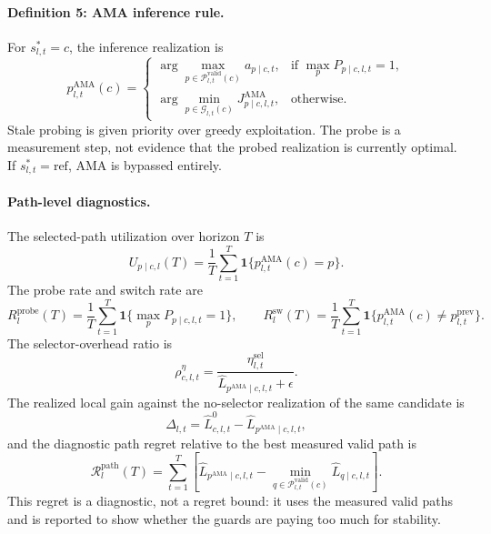 \documentclass{article}
\newcommand{\ama}{\textsc{AMA}}
\begin{document}
\paragraph{Definition 5: AMA inference rule.}
For $s^*_{l,t}=c$, the inference realization is
\begin{equation}
p^{\mathrm{AMA}}_{l,t}(c)
=
\begin{cases}
\arg\max_{p\in\mathcal{P}^{\mathrm{valid}}_{l,t}(c)} a_{p\mid c,t},
& \text{if } \max_p P_{p\mid c,l,t}=1,\\
\arg\min_{p\in\mathcal{G}_{l,t}(c)}J^{\mathrm{AMA}}_{p\mid c,l,t},
& \text{otherwise.}
\end{cases}
\label{eq:ama-selection}
\end{equation}
Stale probing is given priority over greedy exploitation. The probe is a
measurement step, not evidence that the probed realization is currently optimal.
If $s^*_{l,t}=\mathrm{ref}$, \ama{} is bypassed entirely.

\paragraph{Path-level diagnostics.}
The selected-path utilization over horizon $T$ is
\begin{equation}
U_{p\mid c,l}(T)
=
\frac{1}{T}
\sum_{t=1}^{T}
\mathbf{1}\{p^{\mathrm{AMA}}_{l,t}(c)=p\}.
\label{eq:ama-path-utilization}
\end{equation}
The probe rate and switch rate are
\begin{equation}
R^{\mathrm{probe}}_l(T)
=
\frac{1}{T}
\sum_{t=1}^{T}
\mathbf{1}\{\max_p P_{p\mid c,l,t}=1\},
\qquad
R^{\mathrm{sw}}_l(T)
=
\frac{1}{T}
\sum_{t=1}^{T}
\mathbf{1}\{p^{\mathrm{AMA}}_{l,t}(c)\ne p^{\mathrm{prev}}_{l,t}\}.
\label{eq:ama-probe-switch-rate}
\end{equation}
The selector-overhead ratio is
\begin{equation}
\rho^{\eta}_{c,l,t}
=
\frac{\eta^{\mathrm{sel}}_{l,t}}
{\widehat L_{p^{\mathrm{AMA}}\mid c,l,t}+\epsilon}.
\label{eq:ama-overhead-ratio}
\end{equation}
The realized local gain against the no-selector realization of the same
candidate is
\begin{equation}
\widehat{\Delta}_{l,t}
=
\widehat L^0_{c,l,t}
-\widehat L_{p^{\mathrm{AMA}}\mid c,l,t},
\label{eq:ama-realized-gain}
\end{equation}
and the diagnostic path regret relative to the best measured valid path is
\begin{equation}
\mathcal{R}^{\mathrm{path}}_l(T)
=
\sum_{t=1}^{T}
\left[
\widehat L_{p^{\mathrm{AMA}}\mid c,l,t}
-
\min_{q\in\mathcal{P}^{\mathrm{valid}}_{l,t}(c)}
\widehat L_{q\mid c,l,t}
\right].
\label{eq:ama-path-regret}
\end{equation}
This regret is a diagnostic, not a regret bound: it uses the measured valid
paths and is reported to show whether the guards are paying too much for
stability.
\end{document}
